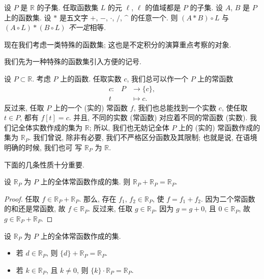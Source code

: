 \begin{example}
    设 $P$ 是 $\mathbb{R}$ 的子集.
    任取函数集 $L$ 的元 $\ell$, $\ell$ 的值域都是 $P$ 的子集.
    设 $A$, $B$ 是 $P$ 上的函数集.
    设 $\ast$ 是五文字
    $+$, $-$, $\cdot$, $/$, $\text{\textasciicircum}$
    的任意一个.
    则
    $(A \ast B) \circ L$
    与
    $(A \circ L) \ast (B \circ L)$
    \emph{不一定}相等.
\end{example}

现在我们考虑一类特殊的函数集;
这也是不定积分的演算重点考察的对象.

我们先为一种特殊的函数集引入方便的记号.

设 $P \subset \mathbb{R}$.
考虑 $P$ 上的函数.
任取实数 $c$, 我们总可以作一个 $P$ 上的常函数
\begin{align*}
    \text{$c$:} \quad
    P & \to \{ c \}, \\
    t & \mapsto c.
\end{align*}
反过来, 任取 $P$ 上的一个 (实的) 常函数 $f$,
我们也总能找到一个实数 $c$, 使任取 $t \in P$, 都有 $f[t] = c$.
并且, 不同的实数 (常函数) 对应着不同的常函数 (实数).
我们记全体实数作成的集为 $\mathbb{R}$;
所以, 我们也无妨记全体 $P$ 上的 (实的) 常函数作成的集为
$\mathbb{R}_{P}$.
我们曾说, 除非有必要, 我们不严格区分函数及其限制;
也就是说, 在语境明确的时候, 我们也可%
写 $\mathbb{R}_{P}$ 为 $\mathbb{R}$.

下面的几条性质十分重要.

\begin{theorem}
    设 $\mathbb{R}_{P}$ 为 $P$ 上的全体常函数作成的集.
    则 $\mathbb{R}_{P} + \mathbb{R}_{P} = \mathbb{R}_{P}$.
\end{theorem}

\begin{proof}
    任取 $f \in \mathbb{R}_{P} + \mathbb{R}_{P}$.
    那么, 存在 $f_1$, $f_2 \in \mathbb{R}_{P}$,
    使 $f = f_1 + f_2$.
    因为二个常函数的和还是常函数,
    故 $f \in \mathbb{R}_{P}$.
    反过来, 任取 $g \in \mathbb{R}_{P}$.
    因为 $g = g + 0$,
    且 $0 \in \mathbb{R}_{P}$,
    故 $g \in \mathbb{R}_{P} + \mathbb{R}_{P}$.
\end{proof}

\begin{theorem}
    设 $\mathbb{R}_{P}$ 为 $P$ 上的全体常函数作成的集.
    \begin{itemize}
        \item 若 $d \in \mathbb{R}_{P}$,
              则 $\{ d \} + \mathbb{R}_{P} = \mathbb{R}_{P}$.
        \item 若 $k \in \mathbb{R}_{P}$,
              且 $k \neq 0$,
              则 $\{ k \} \cdot \mathbb{R}_{P} = \mathbb{R}_{P}$.
    \end{itemize}
\end{theorem}

